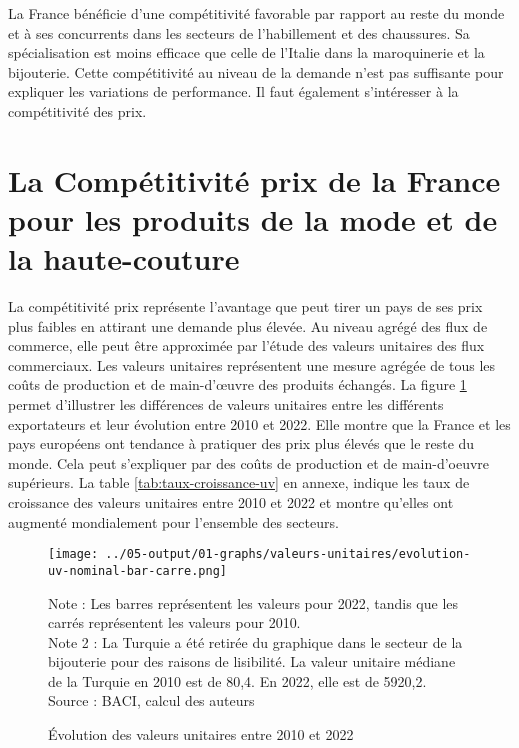 \documentclass[french,10pt,a4paper]{article}
\begin{document}
La France bénéficie d'une compétitivité favorable par rapport au reste du monde et à ses concurrents dans les secteurs de l'habillement et des chaussures. Sa spécialisation est moins efficace que celle de l'Italie dans la maroquinerie et la bijouterie. Cette compétitivité au niveau de la demande n'est pas suffisante pour expliquer les variations de performance. Il faut également s'intéresser à la compétitivité des prix.





\newpage
{}
\section{La Compétitivité prix de la France pour les produits de la mode et de la haute-couture}
La compétitivité prix représente l'avantage que peut tirer un pays de ses prix plus faibles en attirant une demande plus élevée. Au niveau agrégé des flux de commerce, elle peut être approximée par l'étude des valeurs unitaires des flux commerciaux. Les valeurs unitaires représentent une mesure agrégée de tous les coûts de production et de main-d'œuvre des produits échangés. La figure \ref{fig:valeurs-unitaires} permet d'illustrer les différences de valeurs unitaires entre les différents exportateurs et leur évolution entre 2010 et 2022. Elle montre que la France et les pays européens ont tendance à pratiquer des prix plus élevés que le reste du monde. Cela peut s'expliquer par des coûts de production et de main-d'oeuvre supérieurs. La table \ref{tab:taux-croissance-uv} en annexe, indique les taux de croissance des valeurs unitaires entre 2010 et 2022 et montre qu'elles ont augmenté mondialement pour l'ensemble des secteurs.

\begin{figure}[!h]
  \centering
  \texttt{[image: ../05-output/01-graphs/valeurs-unitaires/evolution-uv-nominal-bar-carre.png]}
  \captionsetup{justification=justified, singlelinecheck=false, font=small}
  \caption*{Note : Les barres représentent les valeurs pour 2022, tandis que les carrés représentent les valeurs pour 2010. \\
  Note 2 : La Turquie a été retirée du graphique dans le secteur de la bijouterie pour des raisons de lisibilité. La valeur unitaire médiane de la Turquie en 2010 est de 80,4. En 2022, elle est de 5920,2. \\
  Source : BACI, calcul des auteurs}
  \captionsetup{justification=centering, singlelinecheck=true, font=normalsize}
  \caption{Évolution des valeurs unitaires entre 2010 et 2022}
  \label{fig:valeurs-unitaires}
\end{figure}
\end{document}
